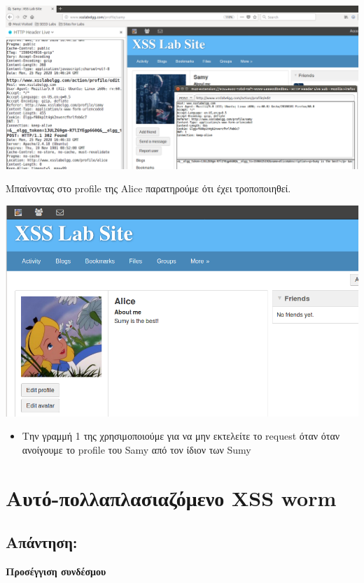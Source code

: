 \begin{center}
			\includegraphics[width=1\textwidth]{image/5.4.PNG}		
\end{center}
\noindent
Μπαίνοντας στο profile της Alice παρατηρούμε ότι έχει τροποποιηθεί.
\begin{center}
			\includegraphics[width=1\textwidth]{image/5.5.PNG}		
\end{center}
\noindent
\begin{itemize}
	\item Την γραμμή 1 της χρησιμοποιούμε για να μην εκτελείτε το request 
	όταν όταν ανοίγουμε το profile του Samy από τον ίδιον των Sumy
\end{itemize}

\section{Αυτό-πολλαπλασιαζόμενο XSS worm}
\subsection*{Απάντηση:}

\noindent
\textbf{Προσέγγιση συνδέσμου}\\

